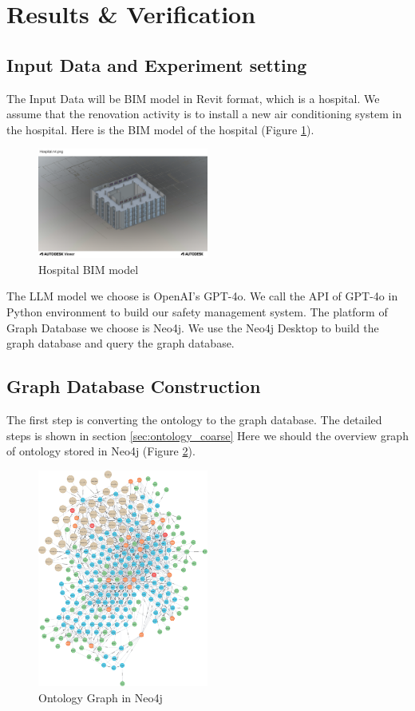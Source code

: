 \section{Results \& Verification}
\label{sec:results}

\subsection*{Input Data and Experiment setting}
The Input Data will be BIM model in Revit format, which is a hospital. We assume that the renovation activity is to install 
a new air conditioning system in the hospital. Here is the BIM model of the hospital (Figure \ref{fig:hospital}).
\begin{figure}
    \centering
    \includegraphics[width=0.5\textwidth]{figures/Hospital.rvt.png}
    \caption{Hospital BIM model}
    \label{fig:hospital}
\end{figure}

The LLM model we choose is OpenAI's GPT-4o. We call the API of GPT-4o in Python environment to build our safety management system.
The platform of Graph Database we choose is Neo4j. We use the Neo4j Desktop to build the graph database and query the graph database.

\subsection{Graph Database Construction}
The first step is converting the ontology to the graph database. The detailed steps is shown in section \ref{sec:ontology_coarse}
Here we should the overview graph of ontology stored in Neo4j (Figure \ref{fig:ontology_graph}).
\begin{figure}
    \centering
    \includegraphics[width=0.5\textwidth]{figures/graph (2).png}
    \caption{Ontology Graph in Neo4j}
    \label{fig:ontology_graph}
\end{figure}
